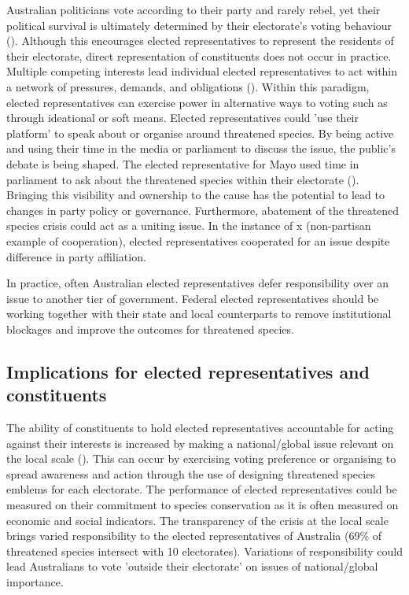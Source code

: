 \documentclass[a4paper,11pt]{article}
\begin{document}
Australian politicians vote according to their party and rarely rebel, yet their political survival is ultimately determined by their electorate's voting behaviour (\cite{brentonWhatLiesWork2010}). Although this encourages elected representatives to represent the residents of their electorate, direct representation of constituents does not occur in practice. Multiple competing interests lead individual elected representatives to act within a network of pressures, demands, and obligations (\cite{brentonWhatLiesWork2010}). Within this paradigm, elected representatives can exercise power in alternative ways to voting such as through ideational or soft means. Elected representatives could 'use their platform' to speak about or organise around threatened species. By being active and using their time in the media or parliament to discuss the issue, the public's debate is being shaped. The elected representative for Mayo used time in parliament to ask about the threatened species within their electorate (\cite{househansardQUESTIONSWRITINGMayo2019}). Bringing this visibility and ownership to the cause has the potential to lead to changes in party policy or governance. Furthermore, abatement of the threatened species crisis could act as a uniting issue. In the instance of x (non-partisan example of cooperation), elected representatives cooperated for an issue despite difference in party affiliation.

In practice, often Australian elected representatives defer responsibility over an issue to another tier of government. Federal elected representatives should be working together with their state and local counterparts to remove institutional blockages and improve the outcomes for threatened species.

\subsection{Implications for elected representatives and constituents}

The ability of constituents to hold elected representatives accountable for acting against their interests is increased by making a national/global issue relevant on the local scale (\cite{pitkinConceptRepresentation1972}). This can occur by exercising voting preference or organising to spread awareness and action through the use of designing threatened species emblems for each electorate. The performance of elected representatives could be measured on their commitment to species conservation as it is often measured on economic and social indicators. The transparency of the crisis at the local scale brings varied responsibility to the elected representatives of Australia (69\% of threatened species intersect with 10 electorates). Variations of responsibility could lead Australians to vote 'outside their electorate' on issues of national/global importance.
\end{document}
